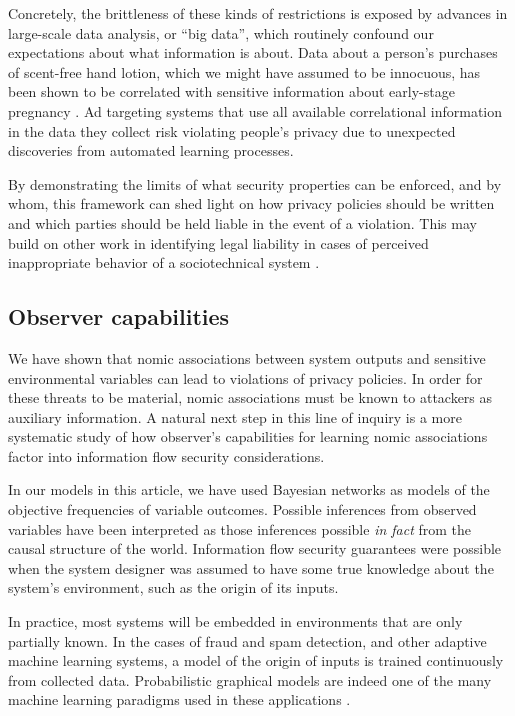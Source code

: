 \documentclass[../thesis.tex]{subfiles}
\begin{document}
Concretely, the brittleness of these kinds of
restrictions is exposed
by advances in large-scale data analysis, or ``big data'',
which routinely confound our expectations about what
information is about.
Data about a person's purchases of scent-free hand lotion,
which we might have assumed to be innocuous, has been
shown to be correlated with sensitive information about
early-stage pregnancy \cite{hill12forbes}.
Ad targeting systems that use all available
correlational information in the data they collect risk
violating people's privacy due to unexpected discoveries
from automated learning processes.

By demonstrating the limits of what security properties
can be enforced, and by whom, this framework can
shed light on how privacy policies should be written
and which parties should be held liable in the event
of a violation.
This may build on other work in identifying legal
liability in cases of perceived inappropriate behavior
of a sociotechnical system \cite{datta2018discrimination}.

\subsection{Observer capabilities}

We have shown that nomic associations between
system outputs and sensitive environmental variables
can lead to violations of privacy policies.
In order for these threats to be material,
nomic associations must be known to attackers
as auxiliary information.
A natural next step in this line of inquiry
is a more systematic study of how
observer's capabilities for learning nomic associations
factor into information flow security considerations.

In our models in this article, we have used
Bayesian networks as models of the objective
frequencies of variable outcomes.
Possible inferences from observed variables
have been interpreted as those inferences
possible \emph{in fact} from the causal
structure of the world.
Information flow security guarantees were
possible when the system designer was
assumed to have some true knowledge about
the system's environment, such as the
origin of its inputs.

In practice, most systems will be embedded in
environments that are only partially known.
In the cases of fraud and spam detection,
and other adaptive machine learning systems,
a model of the origin of inputs is trained
continuously from collected data.
Probabilistic graphical models are indeed
one of the many machine learning paradigms
used in these applications \cite{bishop2006pattern}.
\end{document}
